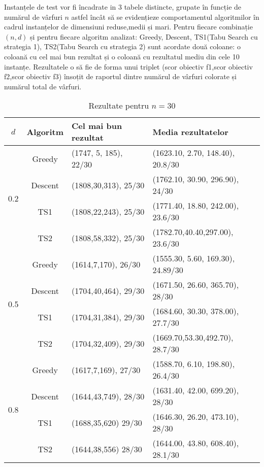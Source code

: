 Instanțele de test vor fi încadrate in 3 tabele distincte, grupate în funcție de  numărul de vârfuri $n$ astfel încât să se evidențieze comportamentul algoritmilor în cadrul instanțelor de dimensiuni reduse,medii și mari. Pentru fiecare combinație $(n,d)$ și pentru fiecare algoritm analizat: Greedy, Descent, TS1(Tabu Search cu strategia 1), TS2(Tabu Search cu strategia 2) sunt acordate două coloane: o coloană cu cel mai bun rezultat și o coloană cu rezultatul mediu din cele 10 instanțe. Rezultatele o să fie de forma unui triplet (scor obiectiv f1,scor obiectiv f2,scor obiectiv f3) însoțit de raportul dintre numărul de vârfuri colorate și numărul total de vârfuri.


\begin{table}[H]
\centering
\caption{Rezultate pentru $n = 30$}
\begin{tabular}{ccll}
\toprule
$d$ & Algoritm & Cel mai bun rezultat  & Media rezultatelor \\
\midrule
\multirow{4}{*}{0.2}
  & Greedy  & (1747, 5, 185), 22/30 & (1623.10, 2.70, 148.40), 20.8/30 \\
  & Descent & (1808,30,313), 25/30   & (1762.10, 30.90, 296.90), 24/30 \\
  & TS1     & (1808,22,243), 25/30    & (1771.40, 18.80, 242.00), 23.6/30 \\
  & TS2     & (1808,58,332), 25/30    & (1782.70,40.40,297.00), 23.6/30 \\
\midrule
\multirow{4}{*}{0.5}
  & Greedy  & (1614,7,170), 26/30     & (1555.30, 5.60, 169.30), 24.89/30 \\
  & Descent & (1704,40,464), 29/30    & (1671.50, 26.60, 365.70), 28/30 \\
  & TS1     & (1704,31,384), 29/30    & (1684.60, 30.30, 378.00),
  27.7/30 \\
  & TS2     & (1704,32,409), 29/30    & (1669.70,53.30,492.70), 28.7/30 \\
\midrule
\multirow{4}{*}{0.8}
  & Greedy  & (1617,7,169), 27/30     & (1588.70, 6.10, 198.80), 26.4/30 \\
  & Descent & (1644,43,749), 28/30    & (1631.40, 42.00, 699.20), 28/30 \\
  & TS1     & (1688,35,620) 29/30     &  (1646.30, 26.20, 473.10), 28/30 \\
  & TS2     &  (1644,38,556) 28/30    &  (1644.00, 43.80, 608.40), 28.1/30 \\
\bottomrule
\end{tabular}\label{tab:rezultate_n30}
\end{table}


